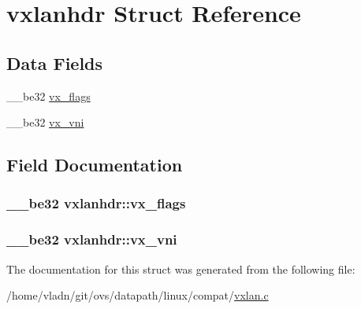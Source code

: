 \hypertarget{structvxlanhdr}{}\section{vxlanhdr Struct Reference}
\label{structvxlanhdr}
\subsection*{Data Fields}
\begin{DoxyCompactItemize}
\item 
\+\_\+\+\_\+be32 \hyperlink{structvxlanhdr_a62dd0a1f926bef8eee34f4cf09dd0e1d}{vx\+\_\+flags}
\item 
\+\_\+\+\_\+be32 \hyperlink{structvxlanhdr_a4239361cddf2d17ca6654a75497dcddd}{vx\+\_\+vni}
\end{DoxyCompactItemize}


\subsection{Field Documentation}
\hypertarget{structvxlanhdr_a62dd0a1f926bef8eee34f4cf09dd0e1d}{}
\subsubsection[{vx\+\_\+flags}]{\setlength{\rightskip}{0pt plus 5cm}\+\_\+\+\_\+be32 vxlanhdr\+::vx\+\_\+flags}\label{structvxlanhdr_a62dd0a1f926bef8eee34f4cf09dd0e1d}
\hypertarget{structvxlanhdr_a4239361cddf2d17ca6654a75497dcddd}{}
\subsubsection[{vx\+\_\+vni}]{\setlength{\rightskip}{0pt plus 5cm}\+\_\+\+\_\+be32 vxlanhdr\+::vx\+\_\+vni}\label{structvxlanhdr_a4239361cddf2d17ca6654a75497dcddd}


The documentation for this struct was generated from the following file\+:\begin{DoxyCompactItemize}
\item 
/home/vladn/git/ovs/datapath/linux/compat/\hyperlink{compat_2vxlan_8c}{vxlan.\+c}\end{DoxyCompactItemize}
